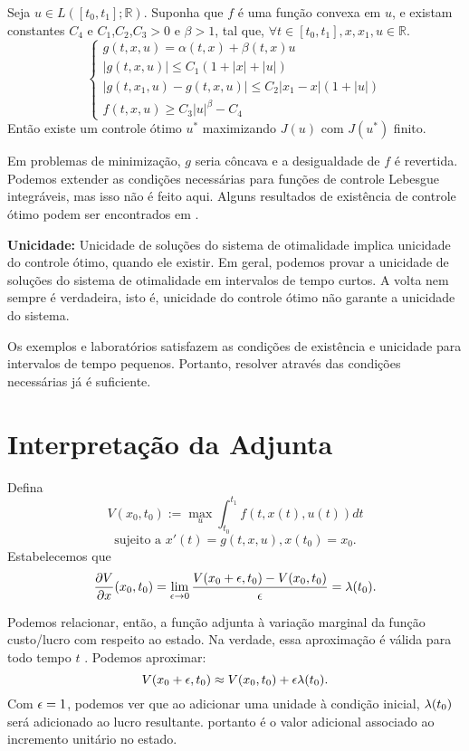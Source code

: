 \begin{theorem}
    Seja $u \in L([t_0,t_1];\mathbb{R})$. Suponha que $f$ é uma função convexa em $u$, e existam constantes $C_4$ e $C_1$,$C_2$,$C_3 >0$ e $\beta > 1$, tal
    que, $\forall t \in [t_0, t_1], x, x_1, u \in \mathbb{R}$. 
    \begin{equation*}
        \begin{cases}
            g(t,x,u) = \alpha (t,x) + \beta (t,x)u \\
            |g(t,x,u)| \leq C_1(1 + |x| + |u|) \\
            |g(t,x_1,u) - g(t,x,u)| \leq C_2|x_1 - x|(1 + |u|) \\
            f(t,x,u) \geq C_3|u|^{\beta} - C_4
        \end{cases}
    \end{equation*}
    Então existe um controle ótimo $u^*$ maximizando $J(u)$ com $J(u^*)$
    finito. 
\end{theorem}

Em problemas de minimização, $g$ seria côncava e a desigualdade de $f$ é
revertida. Podemos extender as condições necessárias para funções de controle
Lebesgue integráveis, mas isso não é feito aqui. Alguns resultados de
existência de controle ótimo podem ser encontrados em \cite{filippov1962}. 

\Space

\textbf{Unicidade:} Unicidade de soluções do sistema de otimalidade implica
unicidade do controle ótimo, quando ele existir. Em geral, podemos provar a
unicidade de soluções do sistema de otimalidade em intervalos de tempo curtos.
A volta nem sempre é verdadeira, isto é, unicidade do controle ótimo não garante a
unicidade do sistema. 

Os exemplos e laboratórios satisfazem as condições de existência e unicidade
para intervalos de tempo pequenos. Portanto, resolver através das condições
necessárias já é suficiente. 

\section{Interpretação da Adjunta}

Defina 
$$
V(x_0, t_0) := \max_u \int_{t_0}^{t_1} f(t,x(t), u(t)) dt
$$
$$
\text{sujeito a } x'(t) = g(t,x,u), x(t_0) = x_0.
$$
Estabelecemos que 
$$\frac{\partial V}{\partial x}(x_0, t_0) = \lim_{\epsilon \to 0} \frac{V(x_0 + \epsilon,
t_0) - V(x_0,t_0)}{\epsilon} = \lambda(t_0).$$

Podemos relacionar, então, a função adjunta à variação marginal da função
custo/lucro com respeito ao estado. Na verdade, essa aproximação é
válida para todo tempo $t$ \cite[136-139]{kamien2012dynamic}. Podemos aproximar: 
\begin{equation*}
    V(x_0 + \epsilon,t_0) \approx V(x_0,t_0) + \epsilon\lambda(t_0). 
\end{equation*}
Com $\epsilon = 1$, podemos ver que ao adicionar uma unidade à condição inicial,
$\lambda(t_0)$ será adicionado ao lucro resultante. portanto é o valor adicional
associado ao incremento unitário no estado. 


